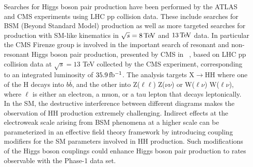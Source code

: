 \documentclass[a4paper,11pt,english]{article}
\begin{document}
\begin{description}[style=unboxed,leftmargin=.2cm]
\item[Analysis on current CMS data set: Higgs boson pair production.] Searches for Higgs boson pair production have been performed by the ATLAS and CMS experiments using LHC pp collision data. These include searches for BSM (Beyond Standard Model) production as well as more targeted searches for production with SM-like kinematics in $\sqrt{s} = 8{\rm \, Te\kern-0.125em V}$ and $13{\rm \, Te\kern-0.125em V}$ data. 
In particular the CMS Firenze group is involved in the important search of resonant and non-resonant Higgs boson pair production, presented by CMS in ~\cite{Analysis}, based on LHC pp collision data at $\sqrt{s}=13$ TeV collected by the CMS experiment, corresponding to an integrated luminosity of $35.9{\rm \, fb^{-1}}$. The analysis targets $\mathrm{X \rightarrow HH}$ where one of the H decays into $b\overline{b}$, and the other into Z($\ell\ell$) Z($\nu\nu$) or W($\ell\nu$) W($\ell\nu$), where $\ell$ is either an electron, a muon, or a tau lepton that decays leptonically. 
 In the SM, the destructive interference between different diagrams makes the observation of HH production extremely challenging.
Indirect effects at the electroweak scale arising from BSM phenomena at a higher scale can be parameterized in an effective field theory framework by introducing coupling modifiers for the SM parameters involved in HH production. %
 Such modifications of the Higgs boson couplings could enhance Higgs boson pair production to rates observable with the Phase-1 data set.  
\begin{siderules}
\end{siderules}
\end{description}
\end{document}
